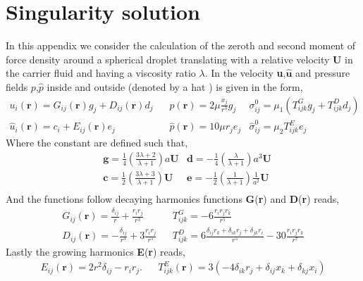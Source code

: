 \section{Singularity solution}

In this appendix we consider the calculation of the zeroth and second moment of force density around a spherical droplet translating with a relative velocity \textbf{U} in the carrier fluid and having a viscosity ratio $\lambda$. 
In \citet{kim2013microhydrodynamics,pozrikidis1992boundary} the velocity \textbf{u},$\hat{\textbf{u}}$ and pressure fields $p$,$\hat{p}$ inside and outside (denoted by a hat ) is given in the form, 
\begin{align*}
    u_i(\textbf{r})
    = G_{ij}(\textbf{r}) g_j 
    + D_{ij}(\textbf{r}) d_j 
    &\;\;\; p(\textbf{r})
    = 2 \mu \frac{x_j}{r^3}g_j
    & \sigma_{ij}^0 
    = \mu_1 ( T^G_{ijk} g_j + T^D_{ijk} d_j )\\
    \hat{u}_i(\textbf{r})
    = c_i 
    + E_{ij}(\textbf{r}) e_j 
    &\;\;\;\hat{p}(\textbf{r})
    = 10 \mu r_je_j
    & \hat\sigma_{ij}^0 
    = \mu_2 T^E_{ijk} e_j 
\end{align*}
Where the constant are defined such that,
\begin{align*}
    &\textbf{g} = \frac{1}{4}\left(\frac{3\lambda + 2}{\lambda +1}\right) a \textbf{U}
    &\textbf{d} = -\frac{1}{4}\left(\frac{\lambda}{\lambda +1}\right) a^3 \textbf{U}\\
    &\textbf{c} = \frac{1}{2}\left(\frac{3\lambda + 3}{\lambda +1}\right) \textbf{U}
    &\textbf{e} = -\frac{1}{2}\left(\frac{1}{\lambda +1}\right) \frac{1}{a^2} \textbf{U}\\
\end{align*}
And the functions follow decaying harmonics functions \textbf{G}(\textbf{r}) and \textbf{D}(\textbf{r}) reads, 
\begin{align*}
    G_{ij}(\textbf{r})
    = \frac{\delta_{ij}}{r}
    + \frac{r_ir_j}{r^3}
    && T^G_{ijk}
    = - 6 \frac{r_ir_jr_k}{r^5}\\
    D_{ij}(\textbf{r})
    = -\frac{\delta_{ij}}{r^3}
    + 3 \frac{r_ir_j}{r^5}
    &&
    T^D_{ijk}
    = 6\frac{\delta_{ij}r_k+\delta_{ik}r_j + \delta_{jk}r_i}{r^5}
    -30 \frac{r_ir_jr_k}{r^7}
\end{align*}
Lastly the growing harmonics \textbf{E}(\textbf{r}) reads, 
\begin{align*}
    E_{ij}(\textbf{r})
    = 2 r^2 \delta_{ij}
    - r_ir_j. 
    &&
    T^E_{ijk}(\textbf{r})
    = 3(-4\delta_{ik} r_j + \delta_{ij}x_k + \delta_{kj}x_i )
\end{align*}


